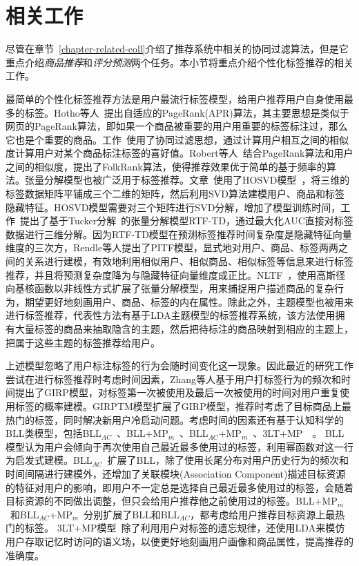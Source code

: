 \section{相关工作}
\label{sec-wpitf-related}
尽管在章节~\ref{chapter-related-coll}介绍了推荐系统中相关的协同过滤算法，但是它重点介绍\textit{商品推荐}和\textit{评分预测}两个任务。本小节将重点介绍个性化标签推荐的相关工作。

最简单的个性化标签推荐方法是用户最流行标签模型，给用户推荐用户自身使用最多的标签。Hotho等人~\cite{hotho2006information}提出自适应的PageRank(APR)算法，其主要思想是类似于网页的PageRank算法，即如果一个商品被重要的用户用重要的标签标注过，那么它也是个重要的商品。工作~\cite{marinho2008collaborative}使用了协同过滤思想，通过计算用户相互之间的相似度计算用户对某个商品标注标签的喜好值。Robert等人~\cite{jaschke2007tag}结合PageRank算法和用户之间的相似度，提出了FolkRank算法，使得推荐效果优于简单的基于频率的算法。张量分解模型也被广泛用于标签推荐。文章~\cite{symeonidis2008tag}使用了HOSVD模型~\cite{de2000multilinear}，将三维的标签数据矩阵平铺成三个二维的矩阵，然后利用SVD算法建模用户、商品和标签隐藏特征。HOSVD模型需要对三个矩阵进行SVD分解，增加了模型训练时间，工作~\cite{rendle2009learning}提出了基于Tucker分解~\cite{tucker1966some}的张量分解模型RTF-TD，通过最大化AUC直接对标签数据进行三维分解。因为RTF-TD模型在预测标签推荐时间复杂度是隐藏特征向量维度的三次方，Rendle等人提出了PITF模型\cite{rendle2010pairwise}，显式地对用户、商品、标签两两之间的关系进行建模，有效地利用相似用户、相似商品、相似标签等信息来进行标签推荐，并且将预测复杂度降为与隐藏特征向量维度成正比。NLTF~\cite{fang2015personalized}，使用高斯径向基核函数以非线性方式扩展了张量分解模型，用来捕捉用户描述商品的复杂行为，期望更好地刻画用户、商品、标签的内在属性。除此之外，主题模型也被用来进行标签推荐，代表性方法有基于LDA主题模型的标签推荐系统\cite{krestel2009latent}，该方法使用拥有大量标签的商品来抽取隐含的主题，然后把待标注的商品映射到相应的主题上，把属于这些主题的标签推荐给用户。

上述模型忽略了用户标注标签的行为会随时间变化这一现象\cite{yin2011temporal}。因此最近的研究工作尝试在进行标签推荐时考虑时间因素，Zhang等人\cite{zhang2012integrating}基于用户打标签行为的频次和时间提出了GIRP模型，对标签第一次被使用及最后一次被使用的时间对用户重复使用标签的概率建模。GIRPTM模型\cite{zhang2012integrating}扩展了GIRP模型，推荐时考虑了目标商品上最热门的标签，同时解决新用户冷启动问题。考虑时间的因素还有基于认知科学的BLL类模型，包括BLL$_{AC}$~\cite{kowald2015forgetting}、BLL+MP$_m$~\cite{kowald2014long}、BLL$_{AC}$+MP$_m$~\cite{kowald2015refining}、3LT+MP~\cite{kowald2015forgetting}~\cite{seitlinger2013recommending}。 BLL模型认为用户会倾向于再次使用自己最近最多使用过的标签，利用幂函数对这一行为启发式建模。BLL$_{AC}$~\cite{kowald2015forgetting}扩展了BLL，除了使用长尾分布对用户历史行为的频次和时间间隔进行建模外，还增加了关联模块(Association Component)描述目标资源的特征对用户的影响，即用户不一定总是选择自己最近最多使用过的标签，会随着目标资源的不同做出调整，但只会给用户推荐他之前使用过的标签。BLL+MP$_m$~\cite{kowald2014long}和BLL$_{AC}$+MP$_m$~\cite{kowald2015refining}分别扩展了BLL和BLL$_{AC}$，都考虑给用户推荐目标资源上最热门的标签。 3LT+MP模型~\cite{seitlinger2013recommending}除了利用用户对标签的遗忘规律，还使用LDA来模仿用户存取记忆时访问的语义场，以便更好地刻画用户画像和商品属性，提高推荐的准确度。

